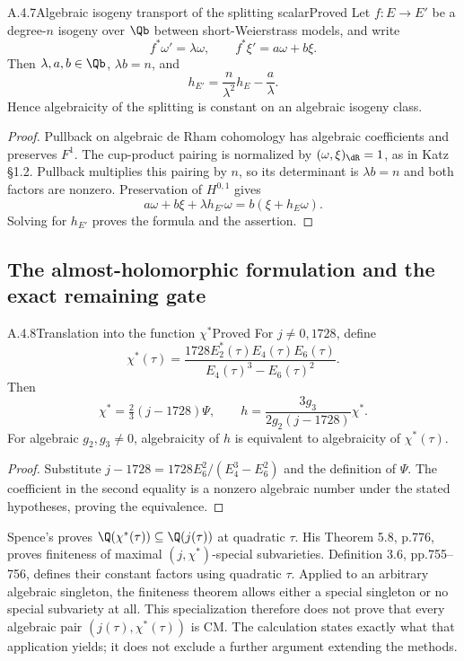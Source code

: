 \begin{result}{A.4.7}{Algebraic isogeny transport of the splitting scalar}{Proved}
Let $f:E\to E'$ be a degree-$n$ isogeny over $\Qb$ between short-Weierstrass models, and write
\[
 f^*\omega'=\lambda\omega,\qquad f^*\xi'=a\omega+b\xi.
\]
Then $\lambda,a,b\in\Qb$, $\lambda b=n$, and
\[
 h_{E'}=\frac{n}{\lambda^2}h_E-\frac a\lambda.
\]
Hence algebraicity of the splitting is constant on an algebraic isogeny class.
\end{result}
\begin{proof}
Pullback on algebraic de Rham cohomology has algebraic coefficients and preserves $F^1$. The cup-product pairing is normalized by $(\omega,\xi)_{\dR}=1$, as in Katz \S1.2. Pullback multiplies this pairing by $n$, so its determinant is $\lambda b=n$ and both factors are nonzero. Preservation of $H^{0,1}$ gives
\[
 a\omega+b\xi+\lambda h_{E'}\omega=b(\xi+h_E\omega).
\]
Solving for $h_{E'}$ proves the formula and the assertion.
\end{proof}

\subsection{The almost-holomorphic formulation and the exact remaining gate}

\begin{result}{A.4.8}{Translation into the function $\chi^*$}{Proved}
For $j\ne0,1728$, define
\[
 \chi^*(\tau)=\frac{1728E_2^*(\tau)E_4(\tau)E_6(\tau)}
 {E_4(\tau)^3-E_6(\tau)^2}.
\]
Then
\[
 \chi^*=\tfrac23(j-1728)\Psi,\qquad
 h=\frac{3g_3}{2g_2(j-1728)}\chi^*.
\]
For algebraic $g_2,g_3\ne0$, algebraicity of $h$ is equivalent to algebraicity of $\chi^*(\tau)$.
\end{result}
\begin{proof}
Substitute $j-1728=1728E_6^2/(E_4^3-E_6^2)$ and the definition of $\Psi$. The coefficient in the second equality is a nonzero algebraic number under the stated hypotheses, proving the equivalence.
\end{proof}

Spence's \cite[Proposition 5.1, p.773]{EllSpence2018} proves $\Q(\chi^*(\tau))\subseteq\Q(j(\tau))$ at quadratic $\tau$. His Theorem 5.8, p.776, proves finiteness of maximal $(j,\chi^*)$-special subvarieties. Definition 3.6, pp.755--756, defines their constant factors using quadratic $\tau$. Applied to an arbitrary algebraic singleton, the finiteness theorem allows either a special singleton or no special subvariety at all. This specialization therefore does not prove that every algebraic pair $(j(\tau),\chi^*(\tau))$ is CM. The calculation states exactly what that application yields; it does not exclude a further argument extending the methods.

